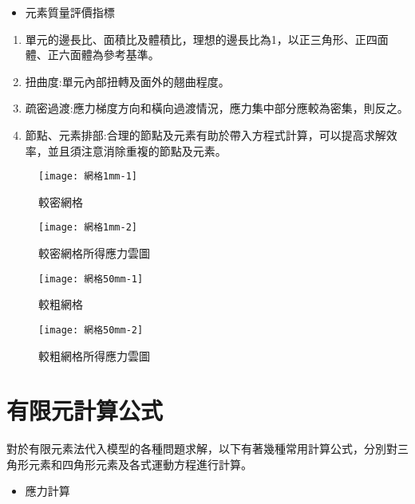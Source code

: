 \begin{itemize}
\item 元素質量評價指標
\end{itemize}

\begin{enumerate}
\item 單元的邊長比、面積比及體積比，理想的邊長比為1，以正三角形、正四面體、正六面體為參考基準。
\item 扭曲度:單元內部扭轉及面外的翹曲程度。
\item 疏密過渡:應力梯度方向和橫向過渡情況，應力集中部分應較為密集，則反之。
\item 節點、元素排部:合理的節點及元素有助於帶入方程式計算，可以提高求解效率，並且須注意消除重複的節點及元素。
\end{enumerate}

\begin{figure}[htbp]
  \centering
  \begin{minipage}{0.45\textwidth}
    \centering
    \texttt{[image: 網格1mm-1]}
    \caption{較密網格}
    \label{網格1mm-1}
  \end{minipage}
  \hfill
  \begin{minipage}{0.45\textwidth}
    \centering
    \texttt{[image: 網格1mm-2]}
    \caption{較密網格所得應力雲圖}
    \label{網格1mm-2}
  \end{minipage}
  
  \vspace{0.75cm} %
  
  \begin{minipage}{0.45\textwidth}
    \centering
    \texttt{[image: 網格50mm-1]}
    \caption{較粗網格}
    \label{網格50mm-1}
  \end{minipage}
  \hfill
  \begin{minipage}{0.45\textwidth}
    \centering
    \texttt{[image: 網格50mm-2]}
    \caption{較粗網格所得應力雲圖}
    \label{網格50mm-2}
  \end{minipage}
\end{figure}
\newpage
\section{有限元計算公式}
對於有限元素法代入模型的各種問題求解，以下有著幾種常用計算公式，分別對三角形元素和四角形元素及各式運動方程進行計算。
\begin{itemize}
\item 應力計算
\end{itemize}

